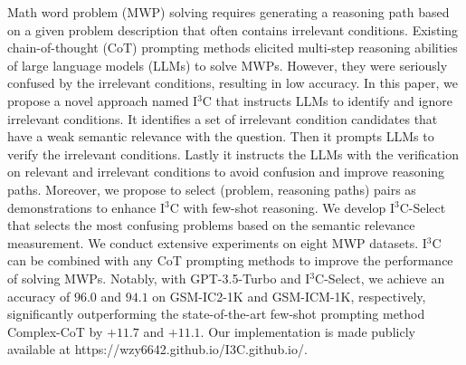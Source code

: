Math word problem (MWP) solving requires generating a reasoning path based on a given problem description that often contains irrelevant conditions. Existing chain-of-thought (CoT) prompting methods elicited multi-step reasoning abilities of large language models (LLMs) to solve MWPs. However, they were seriously confused by the irrelevant conditions, resulting in low accuracy. In this paper, we propose a novel approach named I$^3$C that instructs LLMs to identify and ignore irrelevant conditions. It identifies a set of irrelevant condition candidates that have a weak semantic relevance with the question. Then it prompts LLMs to verify the irrelevant conditions. Lastly it instructs the LLMs with the verification on relevant and irrelevant conditions to avoid confusion and improve reasoning paths. Moreover, we propose to select (problem, reasoning paths) pairs as demonstrations to enhance I$^3$C with few-shot reasoning. We develop I$^3$C-Select that selects the most confusing problems based on the semantic relevance measurement. We conduct extensive experiments on eight MWP datasets. I$^3$C can be combined with any CoT prompting methods to improve the performance of solving MWPs. Notably, with GPT-3.5-Turbo and I$^3$C-Select, we achieve an accuracy of $96.0$ and $94.1$ on GSM-IC2-1K and GSM-ICM-1K, respectively, significantly outperforming the state-of-the-art few-shot prompting method Complex-CoT by $+11.7$ and $+11.1$. Our implementation is made publicly available at https://wzy6642.github.io/I3C.github.io/.
